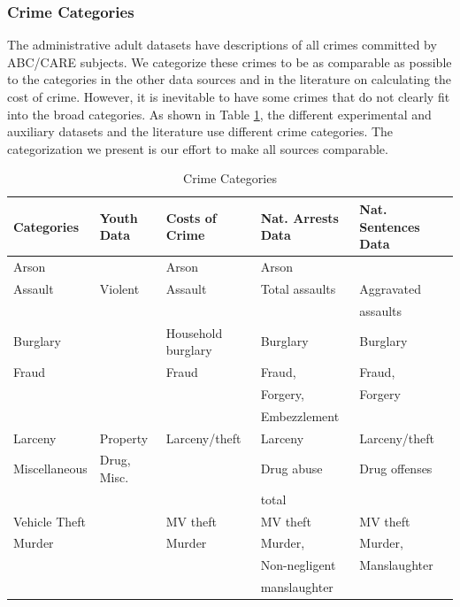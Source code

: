 \subsubsection{Crime Categories}
\noindent The administrative adult datasets have descriptions of all crimes committed by ABC/CARE subjects. We categorize these crimes to be as comparable as possible to the categories in the other data sources and in the literature on calculating the cost of crime. However, it is inevitable to have some crimes that do not clearly fit into the broad categories. As shown in Table \ref{tab:crime_cat}, the different experimental and auxiliary datasets and the literature use different crime categories. The categorization we present is our effort to make all sources comparable.

\begin{table}[H]
\begin{threeparttable}
\scriptsize \caption{Crime Categories} \label{tab:crime_cat}
\begin{tabular}{lllll}
\toprule
{Categories}	&	{Youth Data} & {Costs of Crime} & {Nat. Arrests Data} & {Nat. Sentences Data}	\\
\midrule
{Arson}			&			& Arson					&	Arson			&					\\	
{Assault}			&	Violent			& Assault				&	Total assaults	& Aggravated 		\\		
				&				&						&					& assaults 			\\ 		
{Burglary}		&				& Household burglary	&	Burglary		& Burglary			\\		
{Fraud}			&				& Fraud					&	Fraud,			& Fraud,			\\		
				&				&						&	Forgery,		& Forgery			\\
				&				&						&	Embezzlement	&					\\		
{Larceny}			&	Property	& Larceny/theft			&	Larceny			& Larceny/theft		\\		
{Miscellaneous}	& 	Drug, Misc.	& 					&	Drug abuse		& Drug offenses		\\		
				&				&						&	total			&					\\ 		
{Vehicle Theft}	&				& MV theft	&	MV theft		& MV theft			\\		
{Murder}			&				& Murder				&	Murder,			& Murder,			\\	
				&				&						& 	Non-negligent 	& Manslaughter		\\
				&				&						& 	manslaughter	&   				\\

\end{tabular}
\end{threeparttable}
\end{table}

